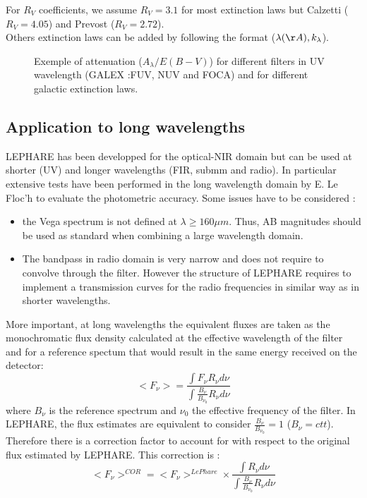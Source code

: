 \documentclass[12pt]{article}
\begin{document}
  For $R_V$ coefficients, we assume  $R_V=3.1$ for most extinction laws but 
   Calzetti ($R_V=4.05$) and Prevost ($R_V=2.72$).\\    
  Others extinction laws can be added by  following the format  ($\lambda(\AA) , k_{\lambda}$).   \\ 
\begin{figure} 
\caption{Exemple of attenuation ($A_{\lambda}/E(B-V)$) for different filters in UV wavelength (GALEX :FUV, NUV and FOCA)  and  for different galactic extinction laws. }
\label{fig:ext}
\end{figure} 

%
\subsection{Application to long wavelengths } 
\label{sec:filtcalib}
%
 LEPHARE has been developped for the optical-NIR domain but can be used at 
 shorter (UV) and longer wavelengths (FIR, submm and radio). 
 In particular extensive tests have been performed in the long wavelength domain
  by E. Le Floc'h to evaluate the photometric accuracy. Some issues have to be considered : 
 \begin{itemize}
 \item  the Vega spectrum is not defined at $\lambda\ge 160\mu m$.
  Thus, AB magnitudes should be used as standard when combining a large wavelength domain. 
 \item The bandpass in radio domain is very narrow and does not require to convolve through the filter.  However the structure of LEPHARE requires to implement a transmission curves for the radio frequencies in similar way as in shorter wavelengths.  
 \end{itemize}
 More important, at long wavelengths the equivalent fluxes are taken as the monochromatic flux density  calculated at the effective wavelength of the filter and for a reference spectum that
 would result in the same energy received on the detector: 
\[ <F_{\nu}> = \frac{\int F_{\nu} R_{\nu} d\nu}{\int \frac{B_{\nu}}{B_{\nu_0}} R_{\nu} d\nu}  \]
 where $B_\nu$ is the reference spectrum and $\nu_0$ the effective frequency of the filter. In LEPHARE, the flux estimates are equivalent to consider  $\frac{B_{\nu}}{B_{\nu_0}}=1$ ($B_{\nu}=ctt$). Therefore there is a correction factor to account for with respect to the original flux 
  estimated by LEPHARE. This correction is : 
\[ <F_{\nu}>^{COR} = <F_{\nu}>^{LePhare} \times \frac{\int R_{\nu} d\nu}{\int \frac{B_{\nu}}{B_{\nu_0}} R_{\nu} d\nu}  \]
   
\end{document}

